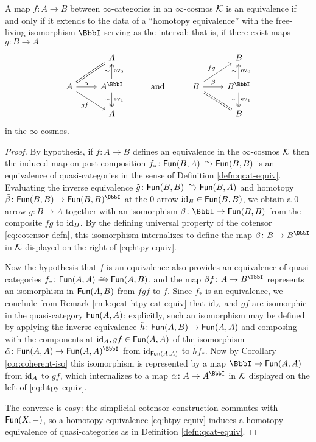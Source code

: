 \begin{lem}\label{lem:equiv-htpy-equiv}
A map $f \colon A \to B$ between $\infty$-categories in an $\infty$-cosmos ${\mathord{\mathcal{K}}}$ is an equivalence if and only if it extends to the data of a ``homotopy equivalence'' with the free-living isomorphism $\iso$ serving as the interval: that is, if there exist maps $g \colon B \to A$
\begin{equation}\label{eq:htpy-equiv}
\begin{tikzcd} & A & &  & B \\ A \arrow[ur, equals] \arrow[dr, "gf"'] \arrow[r, "\alpha"] & A^\iso   \arrow[u, two heads, "\sim", "\ev_0"'] \arrow[d, two heads, "\sim"',  "\ev_1"] & \text{and} &  B \arrow[dr, equals] \arrow[r, "\beta"] \arrow[ur, "fg"] & B^\iso  \arrow[u, two heads, "\sim", "\ev_0"'] \arrow[d, two heads, "\sim"', "\ev_1"] \\ & A & &  & B
\end{tikzcd}
\end{equation}
in the $\infty$-cosmos.
\end{lem}
\begin{proof}
By hypothesis, if $f \colon A \to B$ defines an equivalence in the $\infty$-cosmos ${\mathord{\mathcal{K}}}$ then the induced map on post-composition $f_* \colon \Fun(B,A) \we \Fun(B,B)$ is an equivalence of quasi-categories in the sense of Definition \ref{defn:qcat-equiv}. Evaluating the inverse equivalence $\tilde{g} \colon \Fun(B,B) \we \Fun(B,A)$ and homotopy $\tilde{\beta} \colon \Fun(B,B) \to \Fun(B,B)^\iso$ at the 0-arrow $\textup{id}_B \in {\mathord{\mathsf{Fun}}}(B,B)$, we obtain a 0-arrow $g \colon B \to A$ together with an isomorphism $\beta \colon \iso\to\Fun(B,B)$ from the composite $fg$ to $\textup{id}_B$. By the defining universal property of the cotensor \eqref{eq:cotensor-defn}, this isomorphism internalizes to define the map $\beta \colon B \to B^\iso$ in ${\mathord{\mathcal{K}}}$ displayed on the right of \eqref{eq:htpy-equiv}.

Now the hypothesis that $f$ is an equivalence also provides an equivalence of quasi-categories $f_* \colon \Fun(A,A) \we \Fun(A,B)$, and the map $\beta f \colon A \to B^\iso$ represents an isomorphism in ${\mathord{\mathsf{Fun}}}(A,B)$ from $fgf$ to $f$. Since $f_*$ is an equivalence, we conclude from Remark \ref{rmk:qcat-htpy-cat-equiv} that $\textup{id}_A$ and $gf$ are isomorphic in the quasi-category ${\mathord{\mathsf{Fun}}}(A,A)$: explicitly, such an isomorphism may be defined by applying the inverse equivalence $\tilde{h} \colon {\mathord{\mathsf{Fun}}}(A,B) \to {\mathord{\mathsf{Fun}}}(A,A)$ and composing with the components at $\textup{id}_A, gf \in {\mathord{\mathsf{Fun}}}(A,A)$ of the isomorphism $\tilde{\alpha} \colon \Fun(A,A) \to \Fun(A,A)^\iso$ from $\textup{id}_{{\mathord{\mathsf{Fun}}}(A,A)}$ to $\tilde{h}f_*$. Now by Corollary \ref{cor:coherent-iso} this isomorphism is represented by a map $\iso \to \Fun(A,A)$ from $\textup{id}_A$ to $gf$, which internalizes to a map $\alpha \colon A \to A^\iso$ in ${\mathord{\mathcal{K}}}$ displayed on the left of \eqref{eq:htpy-equiv}.

The converse is easy: the simplicial cotensor construction commutes with ${\mathord{\mathsf{Fun}}}(X,-)$, so a homotopy equivalence \eqref{eq:htpy-equiv} induces a  homotopy equivalence of quasi-categories as in Definition \ref{defn:qcat-equiv}.
\end{proof}


